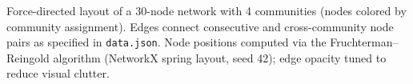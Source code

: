 \caption{Force-directed layout of a 30-node network with 4 communities (nodes colored by community assignment). Edges connect consecutive and cross-community node pairs as specified in \texttt{data.json}. Node positions computed via the Fruchterman--Reingold algorithm (NetworkX spring layout, seed 42); edge opacity tuned to reduce visual clutter.}
